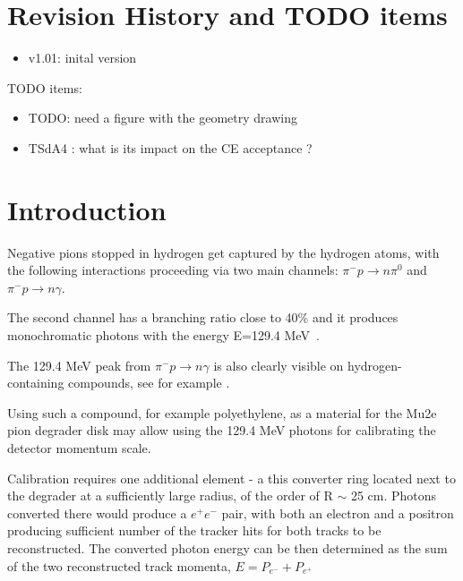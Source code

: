 \documentclass[12pt]{article}
\newcommand {\red}       {\color{red}}
\begin{document}
% 


\newpage
\section {Revision History and TODO items}

\begin{itemize}
\item
  v1.01: inital version
\end{itemize}

{\red
TODO items:

\begin{itemize}
\item
  TODO: need a figure with the geometry drawing
\item
  TSdA4 : what is its impact on the CE acceptance ?
\end{itemize}
}
\newpage
\section {Introduction}
Negative pions stopped in hydrogen get captured by the hydrogen atoms, 
with the following interactions proceeding via two main channels:
$\pi^- p \to n\pi^0$ and $\pi^- p \to n \gamma$.

The second channel has a branching ratio close to 40\% and it produces monochromatic
photons with the energy E=129.4 MeV~\cite{something_on_RPC}.

The 129.4 MeV peak from $\pi^- p \to n \gamma$ is also clearly visible on hydrogen-containing
compounds, see for example \cite{}.

Using such a compound, for example polyethylene, as a material for the Mu2e pion degrader
disk may allow using the 129.4 MeV photons for calibrating the detector momentum scale.

Calibration requires one additional element - a this converter ring located next to the degrader
at a sufficiently large radius, of the order of R $\sim$ 25 cm. Photons converted there would
produce a $e^+e^-$ pair, with both an electron and a positron producing sufficient number of
the tracker hits for both tracks to be reconstructed. 
The converted photon energy can be then determined as the sum of the two reconstructed
track momenta, $E = P_{e^-} + P_{e^+}$ 
\end{document}
